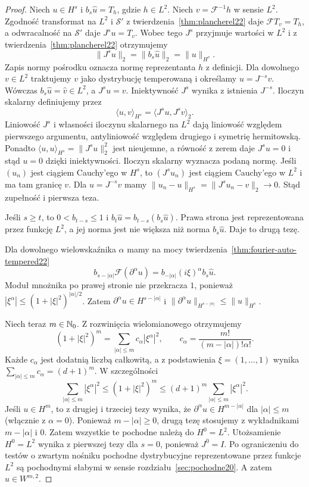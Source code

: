 \begin{proof}
Niech $u\in H^s$ i $b_s\widehat u=T_h$,
gdzie $h\in L^2$. Niech $v=\mathcal F^{-1}h$
w sensie $L^2$. Zgodność transformat na $L^2$
i $\mathcal S'$ z twierdzenia~\ref{thm:plancherel22}
daje $\mathcal FT_v=T_h$, a odwracalność
na $\mathcal S'$ daje $J^su=T_v$.
Wobec tego $J^s$ przyjmuje wartości w $L^2$
i z twierdzenia~\ref{thm:plancherel22}
otrzymujemy
\[
 \|J^s u\|_2=\|b_s\widehat u\|_2
 =\|u\|_{H^s}.
\]
Zapis normy pośrodku oznacza normę reprezentanta
$h$ z definicji. Dla dowolnego $v\in L^2$
traktujemy $v$ jako dystrybucję temperowaną
i określamy $u=J^{-s}v$. Wówczas
$b_s\widehat u=\widehat v\in L^2$, a $J^su=v$.
Iniektywność $J^s$ wynika z istnienia $J^{-s}$.
Iloczyn skalarny definiujemy przez
\[
 \langle u,v\rangle_{H^s}
 =\langle J^s u,J^s v\rangle_2.
\]
Liniowość $J^s$ i własności iloczynu skalarnego
na $L^2$ dają liniowość względem pierwszego
argumentu, antyliniowość względem drugiego
i symetrię hermitowską.
Ponadto $\langle u,u\rangle_{H^s}=\|J^su\|_2^2$
jest nieujemne, a równość z zerem daje $J^su=0$
i stąd $u=0$ dzięki iniektywności.
Iloczyn skalarny wyznacza podaną normę.
Jeśli $(u_n)$ jest ciągiem Cauchy'ego w $H^s$,
to $(J^su_n)$ jest ciągiem Cauchy'ego w $L^2$
i ma tam granicę $v$. Dla $u=J^{-s}v$ mamy
$\|u_n-u\|_{H^s}=\|J^s u_n-v\|_2\to0$.
Stąd zupełność i pierwsza teza.

Jeśli $s\ge t$, to $0<b_{t-s}\le1$ i
$b_t\widehat u=b_{t-s}(b_s\widehat u)$.
Prawa strona jest reprezentowana przez funkcję
$L^2$, a jej norma jest nie większa niż norma
$b_s\widehat u$. Daje to drugą tezę.

Dla dowolnego wielowskaźnika $\alpha$ mamy
na mocy twierdzenia~\ref{thm:fourier-auto-tempered22}
\[
 b_{s-|\alpha|}\mathcal F(\partial^\alpha u)
 =b_{-|\alpha|}(i\xi)^\alpha b_s\widehat u.
\]
Moduł mnożnika po prawej stronie nie przekracza
$1$, ponieważ
$|\xi^\alpha|\le(1+|\xi|^2)^{|\alpha|/2}$.
Zatem $\partial^\alpha u\in H^{s-|\alpha|}$
i $\|\partial^\alpha u\|_{H^{s-|\alpha|}}
\le\|u\|_{H^s}$.

Niech teraz $m\in\mathbb N_0$. Z rozwinięcia
wielomianowego otrzymujemy
\[
 (1+|\xi|^2)^m
 =\sum_{|\alpha|\le m}c_\alpha|\xi^\alpha|^2,
 \qquad c_\alpha=\frac{m!}{(m-|\alpha|)!\alpha!}.
\]
Każde $c_\alpha$ jest dodatnią liczbą całkowitą,
a z podstawienia $\xi=(1,\ldots,1)$ wynika
$\sum_{|\alpha|\le m}c_\alpha=(d+1)^m$.
W szczególności
\[
 \sum_{|\alpha|\le m}|\xi^\alpha|^2
 \le (1+|\xi|^2)^m
 \le (d+1)^m\sum_{|\alpha|\le m}|\xi^\alpha|^2.
\]
Jeśli $u\in H^m$, to z drugiej i trzeciej tezy
wynika, że $\partial^\alpha u\in H^{m-|\alpha|}$
dla $|\alpha|\le m$ (włącznie z $\alpha=0$).
Ponieważ $m-|\alpha|\ge0$, drugą tezę
stosujemy z wykładnikami $m-|\alpha|$ i $0$.
Zatem wszystkie te pochodne należą do $H^0=L^2$.
Utożsamienie $H^0=L^2$ wynika z pierwszej tezy
dla $s=0$, ponieważ $J^0=I$.
Po ograniczeniu do testów o zwartym nośniku
pochodne dystrybucyjne reprezentowane przez
funkcje $L^2$ są pochodnymi słabymi w sensie
rozdziału~\ref{sec:pochodne20}.
A zatem $u\in W^{m,2}$.


\end{proof}
